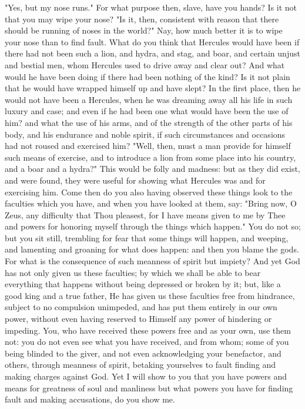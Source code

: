 \documentclass[a4paper]{article}
\begin{document}
"Yes, but my nose runs." For what purpose then, slave, have you hands?
Is it not that you may wipe your nose? "Is it, then, consistent with
reason that there should be running of noses in the world?" Nay, how
much better it is to wipe your nose than to find fault. What do you
think that Hercules would have been if there had not been such a lion,
and hydra, and stag, and boar, and certain unjust and bestial men,
whom Hercules used to drive away and clear out? And what would he
have been doing if there had been nothing of the kind? Is it not plain
that he would have wrapped himself up and have slept? In the first
place, then he would not have been a Hercules, when he was dreaming
away all his life in such luxury and case; and even if he had been
one what would have been the use of him? and what the use of his arms,
and of the strength of the other parts of his body, and his endurance
and noble spirit, if such circumstances and occasions had not roused
and exercised him? "Well, then, must a man provide for himself such
means of exercise, and to introduce a lion from some place into his
country, and a boar and a hydra?" This would be folly and madness:
but as they did exist, and were found, they were useful for showing
what Hercules was and for exercising him. Come then do you also having
observed these things look to the faculties which you have, and when
you have looked at them, say: "Bring now, O Zeus, any difficulty that
Thou pleasest, for I have means given to me by Thee and powers for
honoring myself through the things which happen." You do not so; but
you sit still, trembling for fear that some things will happen, and
weeping, and lamenting and groaning for what does happen: and then
you blame the gods. For what is the consequence of such meanness of
spirit but impiety? And yet God has not only given us these faculties;
by which we shall be able to bear everything that happens without
being depressed or broken by it; but, like a good king and a true
father, He has given us these faculties free from hindrance, subject
to no compulsion unimpeded, and has put them entirely in our own power,
without even having reserved to Himself any power of hindering or
impeding. You, who have received these powers free and as your own,
use them not: you do not even see what you have received, and from
whom; some of you being blinded to the giver, and not even acknowledging
your benefactor, and others, through meanness of spirit, betaking
yourselves to fault finding and making charges against God. Yet I
will show to you that you have powers and means for greatness of soul
and manliness but what powers you have for finding fault and making
accusations, do you show me. 
\end{document}
